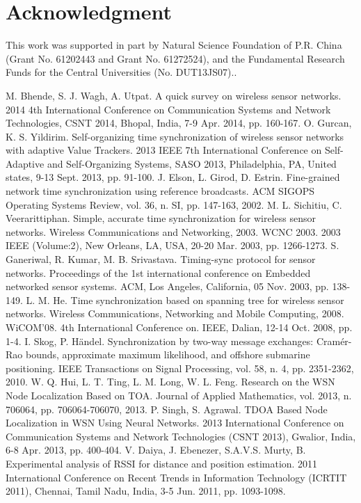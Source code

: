 \documentclass[runningheads,a4paper]{llncs}
\begin{document}
\section{Acknowledgment}
This work was supported in part by Natural Science Foundation of P.R. China (Grant No. 61202443 and Grant
No. 61272524), and the Fundamental Research Funds for the Central Universities (No. DUT13JS07)..

\begin{thebibliography}{11}
 M. Bhende, S. J. Wagh, A. Utpat. A quick survey on wireless sensor networks. 2014 4th International Conference on Communication Systems and Network Technologies, CSNT 2014, Bhopal, India, 7-9 Apr. 2014, pp. 160-167.
 O. Gurcan, K. S. Yildirim. Self-organizing time synchronization of wireless sensor networks with adaptive Value Trackers. 2013 IEEE 7th International Conference on Self-Adaptive and Self-Organizing Systems, SASO 2013, Philadelphia, PA, United states, 9-13 Sept. 2013, pp. 91-100.
 J. Elson, L. Girod, D. Estrin. Fine-grained network time synchronization using reference broadcasts. ACM SIGOPS Operating Systems Review, vol. 36, n. SI, pp. 147-163, 2002.
 M. L. Sichitiu, C. Veerarittiphan. Simple, accurate time synchronization for wireless sensor networks. Wireless Communications and Networking, 2003. WCNC 2003. 2003 IEEE (Volume:2), New Orleans, LA, USA, 20-20 Mar. 2003, pp. 1266-1273.
 S. Ganeriwal, R. Kumar, M. B. Srivastava. Timing-sync protocol for sensor networks. Proceedings of the 1st international conference on Embedded networked sensor systems. ACM, Los Angeles, California, 05 Nov. 2003, pp. 138-149.
 L. M. He. Time synchronization based on spanning tree for wireless sensor networks. Wireless Communications, Networking and Mobile Computing, 2008. WiCOM'08. 4th International Conference on. IEEE, Dalian, 12-14 Oct. 2008, pp. 1-4.
 I. Skog, P. H\"{a}ndel. Synchronization by two-way message exchanges: Cram\'{e}r-Rao bounds, approximate maximum likelihood, and offshore submarine positioning. IEEE Transactions on Signal Processing, vol. 58, n. 4, pp. 2351-2362, 2010.
 W. Q. Hui, L. T. Ting, L. M. Long, W. L. Feng. Research on the WSN Node Localization Based on TOA. Journal of Applied Mathematics, vol. 2013, n. 706064, pp. 706064-706070, 2013.
 P. Singh, S. Agrawal. TDOA Based Node Localization in WSN Using Neural Networks. 2013 International Conference on Communication Systems and Network Technologies (CSNT 2013), Gwalior, India, 6-8 Apr. 2013, pp. 400-404.
 V. Daiya, J. Ebenezer, S.A.V.S. Murty, B. Experimental analysis of RSSI for distance and position estimation. 2011 International Conference on Recent Trends in Information Technology (ICRTIT 2011), Chennai, Tamil Nadu, India, 3-5 Jun. 2011, pp. 1093-1098.





\end{thebibliography}
\end{document}
